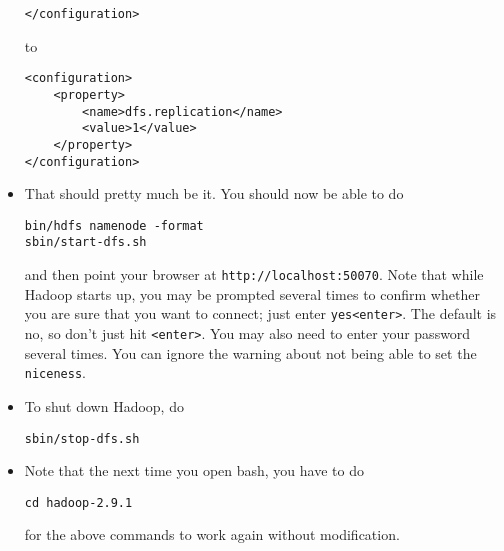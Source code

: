 \documentclass[11pt,a4paper]{article}
\begin{document}
\begin{itemize}
\begin{verbatim}
</configuration>
\end{verbatim}
to
\begin{verbatim}
<configuration>
    <property>
        <name>dfs.replication</name>
        <value>1</value>
    </property>
</configuration>
\end{verbatim}

\item That should pretty much be it. You should now be able to do
\begin{verbatim}
bin/hdfs namenode -format
sbin/start-dfs.sh
\end{verbatim}
and then point your browser at \verb+http://localhost:50070+. Note that while Hadoop starts up, you may be prompted several times to confirm whether you are sure that you want to connect; just enter \verb+yes<enter>+. The default is no, so don't just hit \verb+<enter>+. You may also need to enter your password several times. You can ignore the warning about not being able to set the \texttt{niceness}.
\item To shut down Hadoop, do
\begin{verbatim}
sbin/stop-dfs.sh
\end{verbatim}
\item Note that the next time you open bash, you have to do 
\begin{verbatim}
cd hadoop-2.9.1
\end{verbatim}
for the above commands to work again without modification.
\end{itemize}
\end{document}
